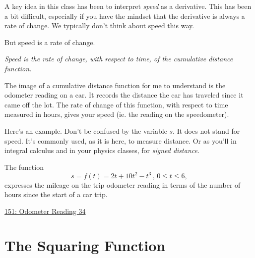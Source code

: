 \documentclass{ximera}
\begin{document}
A key idea in this class has been to interpret \emph{speed} as a derivative. This has been a bit difficult, especially if you have the mindset that the derivative is always a rate of change. We typically don't think about speed this way.

But speed is a rate of change. 

\emph{Speed is the rate of change, with respect to time, of the cumulative distance function.}

The image of a cumulative distance function for me to understand is the odometer reading on a car. It records the distance the car has traveled since it came off the lot. The rate of change of this function, with respect to time measured in hours, gives your speed (ie. the reading on the speedometer).

Here's an example. Don't be confused by the variable $s$. It does not stand for speed. It's commonly used, as it is here, to measure distance. Or as you'll in integral calculus and in your physics classes,  for \emph{signed distance}.

\begin{example}  \label{ExLKDremdmm}
The function
\[
    s = f(t) = 2t+10t^{2}-t^{3} \, , \, 0\leq t\leq 6 ,
\]
expresses the mileage on the trip odometer reading in terms of the number of hours since the start of a car trip.

\begin{onlineOnly}
    \begin{center}
\end{center}
\end{onlineOnly}

\href{https://www.desmos.com/calculator/t1ruocrgm4}{151: Odometer Reading 34}





\end{example}


\section{The Squaring Function}
\end{document}
